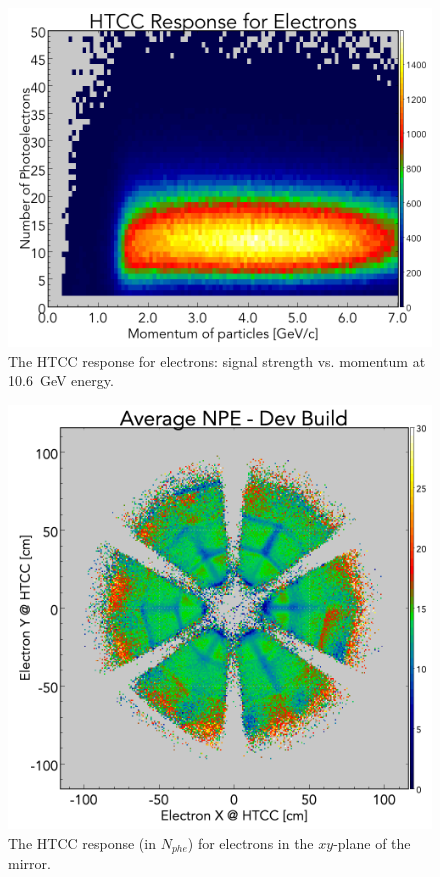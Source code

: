 \begin{figure}[!ht]
    \centering
    \includegraphics[width=1.0\linewidth,trim={0.0cm 0.0cm 0.0cm 1.73cm},clip]{images/HTCC_Response_run4013.png}
    \caption{The HTCC response for electrons: signal strength vs. momentum at 10.6~GeV energy.}
    \label{fig:HTCC_Response_run4013}
\end{figure}

\begin{figure}[!ht]
    \centering
    \includegraphics[width=1.0\linewidth,trim={0.0cm 0.0cm 0.0cm 1.67cm},clip]{images/avgNPE_Theta_Phi_Dev_Build-2_NO_HOLES.png}
    \caption{The HTCC response (in $N_{phe}$) for electrons in the $xy$-plane of the mirror.}
    \label{fig:avgNPE_Theta_Phi_Dev_Build-2_NO_HOLES}
\end{figure}

